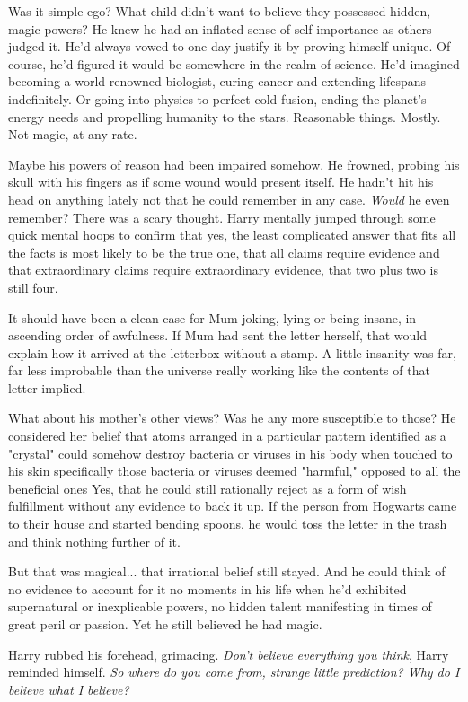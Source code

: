 Was it simple ego? What child didn't want to believe they
possessed hidden, magic powers? He knew he had an
inflated sense of self-importance as others judged it. He'd
always vowed to one day justify it by proving himself
unique. Of course, he'd figured it would be somewhere in
the realm of science. He'd imagined becoming a world
renowned biologist, curing cancer and extending lifespans
indefinitely. Or going into physics to perfect cold fusion,
ending the planet's energy needs and propelling humanity
to the stars. Reasonable things. Mostly. Not magic, at any
rate.

Maybe his powers of reason had been impaired somehow.
He frowned, probing his skull with his fingers as if some
wound would present itself. He hadn't hit his head on
anything lately{\el} not that he could remember in any case.
\emph{Would} he even remember? There was a scary thought.
Harry mentally jumped through some quick mental hoops
to confirm that yes, the least complicated answer that fits all
the facts is most likely to be the true one, that all claims
require evidence and that extraordinary claims require
extraordinary evidence, that two plus two is still four.

It should have been a clean case for Mum joking, lying or
being insane, in ascending order of awfulness. If Mum had
sent the letter herself, that would explain how it arrived at
the letterbox without a stamp. A little insanity was far, far
less improbable than the universe really working like the
contents of that letter implied.

What about his mother's other views? Was he any more
susceptible to those? He considered her belief that atoms
arranged in a particular pattern identified as a "crystal"
could somehow destroy bacteria or viruses in his body
when touched to his skin{\el} specifically those bacteria or
viruses deemed "harmful," opposed to all the beneficial
ones{\el} Yes, that he could still rationally reject as a form of
wish fulfillment without any evidence to back it up. If the
person from Hogwarts came to their house and started
bending spoons, he would toss the letter in the trash and
think nothing further of it.

But that {\el} was magical... that irrational belief still stayed.
And he could think of no evidence to account for it{\el} no
moments in his life when he'd exhibited supernatural or
inexplicable powers, no hidden talent manifesting in times
of great peril or passion. Yet he still believed he had magic.

Harry rubbed his forehead, grimacing. \emph{Don't believe
everything you think}, Harry reminded himself. \emph{So where
do you come from, strange little prediction? Why do I
believe what I believe?}


